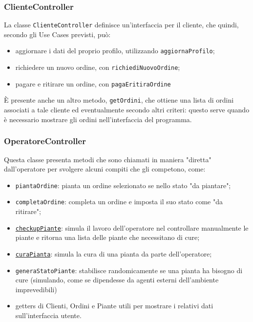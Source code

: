 \documentclass{article}
\newcommand{\code}[1]{\texttt{#1}}
\begin{document}
\subsubsection{ClienteController}
La classe \code{ClienteController} definisce un'interfaccia per il cliente, che quindi, secondo gli Use Cases previsti, può: 
\begin{itemize}
    \item aggiornare i dati del proprio profilo, utilizzando \code{aggiornaProfilo};
    \item richiedere un nuovo ordine, con \code{richiediNuovoOrdine};
    \item pagare e ritirare un ordine, con \code{pagaEritiraOrdine}
\end{itemize}
È presente anche un altro metodo, \code{getOrdini}, che ottiene una lista di ordini associati a tale cliente ed eventualmente secondo altri criteri: questo serve quando è necessario mostrare gli ordini nell'interfaccia del programma.

\subsubsection{OperatoreController}
Questa classe presenta metodi che sono chiamati in maniera "diretta" dall'operatore per svolgere alcuni compiti che gli competono, come:
\begin{itemize}
    \item \code{piantaOrdine}: pianta un ordine selezionato se nello stato "da piantare";
    \item \code{completaOrdine}: completa un ordine e imposta il suo stato come "da ritirare";
    \item \hyperref[fig:snippet_checkuppiante_curapianta]{\code{checkupPiante}}: simula il lavoro dell'operatore nel controllare manualmente le piante e ritorna una lista delle piante che necessitano di cure;
    \item \hyperref[fig:snippet_checkuppiante_curapianta]{\code{curaPianta}}: simula la cura di una pianta da parte dell'operatore;
    \item \code{generaStatoPiante}: stabilisce randomicamente se una pianta ha bisogno di cure (simulando, come se dipendesse da agenti esterni dell'ambiente imprevedibili)
    \item getters di Clienti, Ordini e Piante utili per mostrare i relativi dati sull'interfaccia utente.
\end{itemize}
\end{document}
